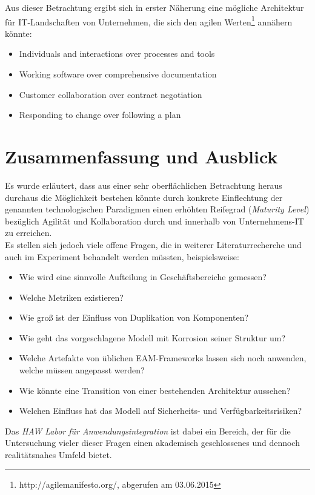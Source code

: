 \documentclass{llncs}
\begin{document}
Aus dieser Betrachtung ergibt sich in erster Näherung eine mögliche Architektur für IT-Landschaften von Unternehmen, die sich den agilen Werten\footnote{http://agilemanifesto.org/, abgerufen am 03.06.2015} annähern könnte:

\begin{itemize}
\item Individuals and interactions over processes and tools
\item Working software over comprehensive documentation
\item Customer collaboration over contract negotiation
\item Responding to change over following a plan
\end{itemize}

\section{Zusammenfassung und Ausblick}
Es wurde erläutert, dass aus einer sehr oberflächlichen Betrachtung heraus durchaus die Möglichkeit bestehen könnte durch konkrete Einflechtung der genannten technologischen Paradigmen einen erhöhten Reifegrad (\textit{Maturity Level}) bezüglich Agilität und Kollaboration durch und innerhalb von Unternehmens-IT zu erreichen.\\

Es stellen sich jedoch viele offene Fragen, die in weiterer Literaturrecherche und auch im Experiment behandelt werden müssten, beispielsweise:
\begin{itemize}
	\item Wie wird eine sinnvolle Aufteilung in Geschäftsbereiche gemessen?
	\item Welche Metriken existieren?
	\item Wie groß ist der Einfluss von Duplikation von Komponenten?
	\item Wie geht das vorgeschlagene Modell mit Korrosion seiner Struktur um?
	\item Welche Artefakte von üblichen EAM-Frameworks lassen sich noch anwenden, welche müssen angepasst werden?
	\item Wie könnte eine Transition von einer bestehenden Architektur aussehen?
	\item Welchen Einfluss hat das Modell auf Sicherheits- und Verfügbarkeitsrisiken?
\end{itemize}

Das \textit{HAW Labor für Anwendungsintegration} ist dabei ein Bereich, der für die Untersuchung vieler dieser Fragen einen akademisch geschlossenes und dennoch realitätsnahes Umfeld bietet.\\
\end{document}
